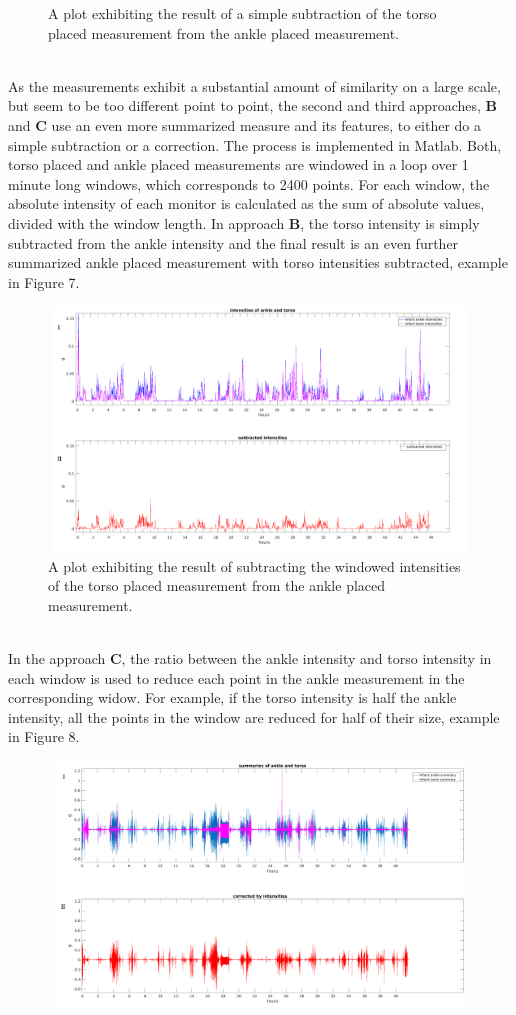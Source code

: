 \documentclass{article}
\begin{document}
{\begin{figure}[h]
\caption{A plot exhibiting the result of a simple subtraction of the torso placed measurement from the ankle placed measurement.}
\end{figure}
\\As the measurements exhibit a substantial amount of similarity on a large scale, but seem to be too different point to point, the second and third approaches, \textbf{B} and \textbf{C} use an even more summarized measure and its features, to either do a simple subtraction or a correction. The process is implemented in Matlab. Both, torso placed and ankle placed measurements are windowed in a loop over 1 minute long windows, which corresponds to 2400 points. For each window, the absolute intensity of each monitor is calculated as the sum of absolute values, divided with the window length. In approach \textbf{B}, the torso intensity is simply subtracted from the ankle intensity and the final result is an even further summarized ankle placed measurement with torso intensities subtracted, example in Figure 7.
\begin{figure}[h]
\includegraphics[width=15cm, height=6.5cm]{subtractedIntensities.png}
\caption{A plot exhibiting the result of subtracting the windowed intensities of the torso placed measurement from the ankle placed measurement.}
\end{figure}
\\
In the approach \textbf{C}, the ratio between the ankle intensity and torso intensity in each window is used to reduce each point in the ankle measurement in the corresponding widow. For example, if the torso intensity is half the ankle intensity, all the points in the window are reduced for half of their size, example in Figure 8.
\begin{figure}[h]
\includegraphics[width=15cm, height=6.5cm]{correctingIntensities.png}

\end{figure}}
\end{document}
